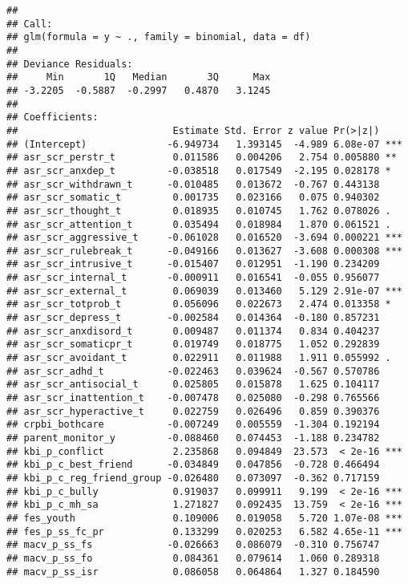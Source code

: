 \documentclass[
]{article}
\begin{document}
\begin{verbatim}
## 
## Call:
## glm(formula = y ~ ., family = binomial, data = df)
## 
## Deviance Residuals: 
##     Min       1Q   Median       3Q      Max  
## -3.2205  -0.5887  -0.2997   0.4870   3.1245  
## 
## Coefficients:
##                           Estimate Std. Error z value Pr(>|z|)    
## (Intercept)              -6.949734   1.393145  -4.989 6.08e-07 ***
## asr_scr_perstr_t          0.011586   0.004206   2.754 0.005880 ** 
## asr_scr_anxdep_t         -0.038518   0.017549  -2.195 0.028178 *  
## asr_scr_withdrawn_t      -0.010485   0.013672  -0.767 0.443138    
## asr_scr_somatic_t         0.001735   0.023166   0.075 0.940302    
## asr_scr_thought_t         0.018935   0.010745   1.762 0.078026 .  
## asr_scr_attention_t       0.035494   0.018984   1.870 0.061521 .  
## asr_scr_aggressive_t     -0.061028   0.016520  -3.694 0.000221 ***
## asr_scr_rulebreak_t      -0.049166   0.013627  -3.608 0.000308 ***
## asr_scr_intrusive_t      -0.015407   0.012951  -1.190 0.234209    
## asr_scr_internal_t       -0.000911   0.016541  -0.055 0.956077    
## asr_scr_external_t        0.069039   0.013460   5.129 2.91e-07 ***
## asr_scr_totprob_t         0.056096   0.022673   2.474 0.013358 *  
## asr_scr_depress_t        -0.002584   0.014364  -0.180 0.857231    
## asr_scr_anxdisord_t       0.009487   0.011374   0.834 0.404237    
## asr_scr_somaticpr_t       0.019749   0.018775   1.052 0.292839    
## asr_scr_avoidant_t        0.022911   0.011988   1.911 0.055992 .  
## asr_scr_adhd_t           -0.022463   0.039624  -0.567 0.570786    
## asr_scr_antisocial_t      0.025805   0.015878   1.625 0.104117    
## asr_scr_inattention_t    -0.007478   0.025080  -0.298 0.765566    
## asr_scr_hyperactive_t     0.022759   0.026496   0.859 0.390376    
## crpbi_bothcare           -0.007249   0.005559  -1.304 0.192194    
## parent_monitor_y         -0.088460   0.074453  -1.188 0.234782    
## kbi_p_conflict            2.235868   0.094849  23.573  < 2e-16 ***
## kbi_p_c_best_friend      -0.034849   0.047856  -0.728 0.466494    
## kbi_p_c_reg_friend_group -0.026480   0.073097  -0.362 0.717159    
## kbi_p_c_bully             0.919037   0.099911   9.199  < 2e-16 ***
## kbi_p_c_mh_sa             1.271827   0.092435  13.759  < 2e-16 ***
## fes_youth                 0.109006   0.019058   5.720 1.07e-08 ***
## fes_p_ss_fc_pr            0.133299   0.020253   6.582 4.65e-11 ***
## macv_p_ss_fs             -0.026663   0.086079  -0.310 0.756747    
## macv_p_ss_fo              0.084361   0.079614   1.060 0.289318    
## macv_p_ss_isr             0.086058   0.064864   1.327 0.184590    

\end{verbatim}
\end{document}
